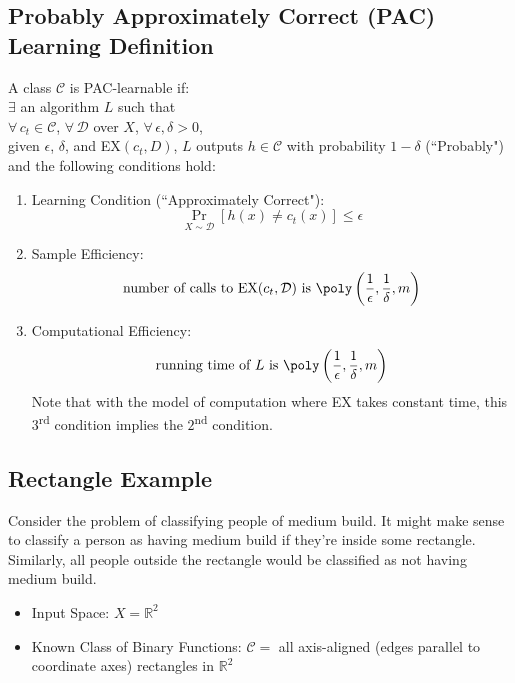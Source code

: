 \documentclass{article}
\begin{document}
\subsection{Probably Approximately Correct (PAC) Learning Definition}

A class $\mathcal{C}$ is PAC-learnable if: \\
$\exists$ an algorithm $L$ such that \\
$\forall \, c_t \in \mathcal{C}$, $\forall \, \mathcal{D}$ over $X$, $\forall \, \epsilon, \delta > 0$, \\
given $\epsilon$, $\delta$, and EX$(c_t, D)$, $L$ outputs $h \in \mathcal{C}$ with probability $1 - \delta$ (``Probably") and the following conditions hold:

\begin{enumerate}

    \item Learning Condition (``Approximately Correct"):
    \[\Pr_{X \sim \mathcal{D}}[h(x) \neq c_t(x)] \leq \epsilon\]

    \item Sample Efficiency:
    \[\text{number of calls to EX} (c_t, \mathcal{D}) \text{ is } \poly\left(\frac{1}{\epsilon}, \frac{1}{\delta}, m\right)\]

    \item Computational Efficiency:
    \[\text{running time of } L \text{ is } \poly\left(\frac{1}{\epsilon}, \frac{1}{\delta}, m\right)\]
    Note that with the model of computation where EX takes constant time, this $3$\textsuperscript{rd} condition implies the $2$\textsuperscript{nd} condition.

\end{enumerate}

\subsection{Rectangle Example}

Consider the problem of classifying people of medium build. It might make sense to classify a person as having medium build if they're inside some rectangle. Similarly, all people outside the rectangle would be classified as not having medium build.

\begin{itemize}

    \item
    Input Space: $X = \mathbb{R}^2$

    \item
    Known Class of Binary Functions: $\mathcal{C} =$ all axis-aligned (edges parallel to coordinate axes) rectangles in $\mathbb{R}^2$

\end{itemize}
\end{document}
